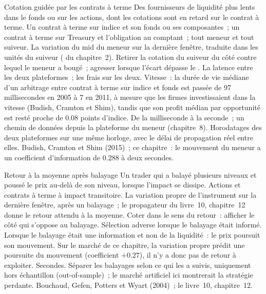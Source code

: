 \begin{strategyfile}{Cotation guidée par les contrats à terme}\label{strat:hf:short-horizon-alpha:futures}
 Des fournisseurs de liquidité plus lents dans le fonds ou sur les actions, dont les cotations sont en retard sur le contrat à terme.
 Un contrat à terme sur indice et son fonds ou ses composantes~; un contrat à terme sur Treasury et l'obligation au comptant~; tout meneur et tout suiveur.
 La variation du mid du meneur sur la dernière fenêtre, traduite dans les unités du suiveur ( du chapitre~2).
 Retirer la cotation du suiveur du côté contre lequel le meneur a bougé~; agresser lorsque l'écart dépasse le .
 La latence entre les deux plateformes~; les frais sur les deux.
 Vitesse~: la durée de vie médiane d'un arbitrage entre contrat à terme sur indice et fonds est passée de 97 millisecondes en 2005 à 7 en 2011, à mesure que les firmes investissaient dans
la vitesse (Budish, Cramton et Shim), tandis que son profit médian par opportunité est resté proche de 0.08 points d'indice.
 De la milliseconde à la seconde~; un chemin de données depuis la plateforme du meneur (chapitre~8).
 Horodatages des deux plateformes sur une même horloge, avec le délai de propagation réel entre elles.
 Budish, Cramton et Shim (2015)~; ce chapitre~: le mouvement du meneur a un coefficient d'information de 0.288 à deux secondes.
\end{strategyfile}

\begin{strategyfile}{Retour à la moyenne après balayage}\label{strat:hf:short-horizon-alpha:sweep}
 Un trader qui a balayé plusieurs niveaux et poussé le prix au-delà de son niveau, lorsque l'impact se dissipe.
 Actions et contrats à terme à impact transitoire.
 La variation propre de l'instrument sur la dernière fenêtre, après un balayage~; le propagateur du livre~10, chapitre~12 donne le
retour attendu à la moyenne.
 Coter dans le sens du retour~: afficher le côté qui s'oppose au balayage.
 Sélection adverse lorsque le balayage était informé.
 Lorsque le balayage était une information et non de la liquidité~: le prix poursuit son mouvement. Sur le marché de ce chapitre, la variation propre prédit
une poursuite du mouvement (coefficient $+0.27$), il n'y a donc pas de retour à exploiter.
 Secondes.
 Séparer les balayages selon ce qui les a suivis, uniquement hors échantillon (out-of-sample)~; le marché artificiel ici montrerait la stratégie perdante.
 Bouchaud, Gefen, Potters et Wyart (2004)~; le livre~10, chapitre~12.
\end{strategyfile}

